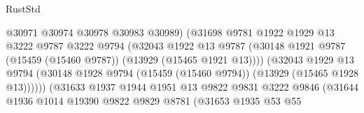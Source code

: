 \begin{lexlean}{RustStd}
\begin{coremodule}
                                          @30971
                                          @30974
                                          @30978
                                          @30983
                                          @30989)
                                        (@31698
                                          @9781
                                          @1922
                                          @1929
                                          @13
                                          @3222
                                          @9787
                                          @3222
                                          @9794
                                          (@32043
                                            @1922
                                            @13
                                            @9787
                                            (@30148
                                              @1921
                                              @9787
                                              (@15459 (@15460 @9787))
                                              (@13929 (@15465 @1921 @13))))
                                          (@32043
                                            @1929
                                            @13
                                            @9794
                                            (@30148
                                              @1928
                                              @9794
                                              (@15459 (@15460 @9794))
                                              (@13929 (@15465 @1928 @13))))))
                                      (@31633
                                        @1937
                                        @1944
                                        @1951
                                        @13
                                        @9822
                                        @9831
                                        @3222
                                        @9846
                                        (@31644
                                          @1936
                                          @1014
                                          @19390
                                          @9822
                                          @9829
                                          @8781
                                          (@31653
                                            @1935
                                            @53
                                            @55

\end{coremodule}
\end{lexlean}
